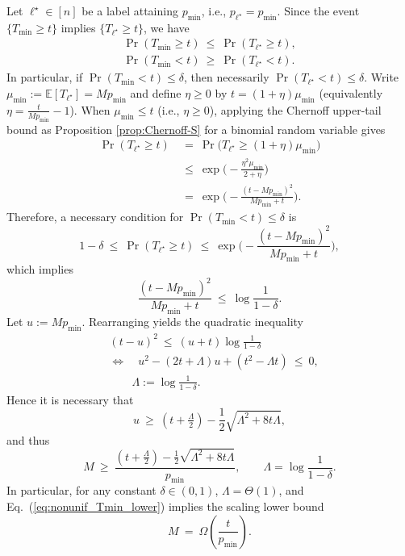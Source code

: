 \documentclass[aps,prx,reprint,superscriptaddress,amsmath,amssymb,longbibliography,floatfix]{revtex4-2}
\newcommand{\dsE}{\mathbb{E}}
\theoremstyle{plain}
\theoremstyle{definition}
\theoremstyle{remark}
\begin{document}
Let $\ell^\star\in[n]$ be a label attaining $p_{\min}$, i.e., $p_{\ell^\star}=p_{\min}$.
Since the event $\{T_{\min}\ge t\}$ implies $\{T_{\ell^\star}\ge t\}$, we have
\begin{equation}
\begin{gathered}
\Pr(T_{\min}\ge t)\ \le\ \Pr(T_{\ell^\star}\ge t),
    \\
    \Pr(T_{\min}<t)\ \ge\ \Pr(T_{\ell^\star}<t).
\end{gathered}
\end{equation}
In particular, if $\Pr(T_{\min}<t)\le \delta$, then necessarily $\Pr(T_{\ell^\star}<t)\le \delta$.
Write $\mu_{\min}:=\dsE[T_{\ell^\star}]=Mp_{\min}$ and define $\eta\ge 0$ by
$t=(1+\eta)\mu_{\min}$ (equivalently $\eta=\frac{t}{Mp_{\min}}-1$).
When $\mu_{\min}\le t$ (i.e., $\eta\ge 0$), applying the  Chernoff upper-tail bound as Proposition \ref{prop:Chernoff-S} for a binomial random variable gives
\begin{equation}
\begin{aligned}
\Pr(T_{\ell^\star}\ge t)
    &\ =\ \Pr\!\big(T_{\ell^\star}\ge (1+\eta)\mu_{\min}\big)\\
    &\ \le\ \exp\!\Big(-\frac{\eta^2\mu_{\min}}{2+\eta}\Big)\\
    &\ =\ \exp\!\Big(-\frac{(t-Mp_{\min})^2}{Mp_{\min}+t}\Big).
\end{aligned}
\end{equation}
Therefore, a necessary condition for $\Pr(T_{\min}<t)\le \delta$ is
\begin{equation}
    1-\delta\ \le\ \Pr(T_{\ell^\star}\ge t)
    \ \le\ \exp\!\Big(-\frac{(t-Mp_{\min})^2}{Mp_{\min}+t}\Big),
\end{equation}
which implies
\begin{equation}
    \frac{(t-Mp_{\min})^2}{Mp_{\min}+t}\ \le\ \log\frac{1}{1-\delta}.
\end{equation}
Let $u:=Mp_{\min}$. Rearranging yields the quadratic inequality
\begin{equation}
\begin{aligned}
&(t-u)^2\ \le\ (u+t)\log\frac{1}{1-\delta}
    \\
    &\Longleftrightarrow\quad
    u^2-(2t+\Lambda)u+(t^2-\Lambda t)\ \le\ 0,
    \\
    &\qquad \Lambda:=\log\frac{1}{1-\delta}.
\end{aligned}
\end{equation}
Hence it is necessary that
\begin{equation}
    u \ \ge\ (t+\tfrac{\Lambda}{2})-\frac{1}{2}\sqrt{\Lambda^2+8t\Lambda},
\end{equation}
and thus
\begin{equation}
    M\ \ge\ \frac{(t+\tfrac{\Lambda}{2})-\frac{1}{2}\sqrt{\Lambda^2+8t\Lambda}}{p_{\min}},
    \qquad \Lambda=\log\frac{1}{1-\delta}.
    \label{eq:nonunif_Tmin_lower}
\end{equation}
In particular, for any constant $\delta\in(0,1)$, $\Lambda=\Theta(1)$, and Eq.~(\ref{eq:nonunif_Tmin_lower})
implies the scaling lower bound
\begin{equation}
    M\ =\ \Omega\!\left(\frac{t}{p_{\min}}\right).
    \label{eq:nonunif_Tmin_lower_simplified}
\end{equation}
\end{document}
